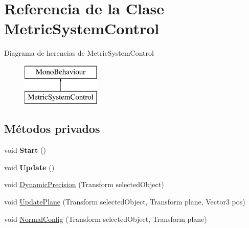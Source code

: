 \hypertarget{class_metric_system_control}{}\section{Referencia de la Clase Metric\+System\+Control}
\label{class_metric_system_control}
Diagrama de herencias de Metric\+System\+Control\begin{figure}[H]
\begin{center}
\leavevmode
\includegraphics[height=2.000000cm]{class_metric_system_control}
\end{center}
\end{figure}
\subsection*{Métodos privados}
\begin{DoxyCompactItemize}
\item 
\mbox{\label{class_metric_system_control_a4a80bda60b22963614748a45ada7067e}} 
void {\bfseries Start} ()
\item 
\mbox{\label{class_metric_system_control_a2316b4c6c9a620507878dfe0b601c9f0}} 
void {\bfseries Update} ()
\item 
void \mbox{\hyperlink{class_metric_system_control_a853f57f47211b8c3a1f48c53ba552a0e}{Dynamic\+Precision}} (Transform selected\+Object)
\item 
void \mbox{\hyperlink{class_metric_system_control_a233ff34bc7bf5ae589ffe0146430f2e0}{Update\+Plane}} (Transform selected\+Object, Transform plane, Vector3 pos)
\item 
void \mbox{\hyperlink{class_metric_system_control_a9ec2278d531e8f0705a241c97aae7909}{Normal\+Config}} (Transform selected\+Object, Transform plane)
\end{DoxyCompactItemize}
